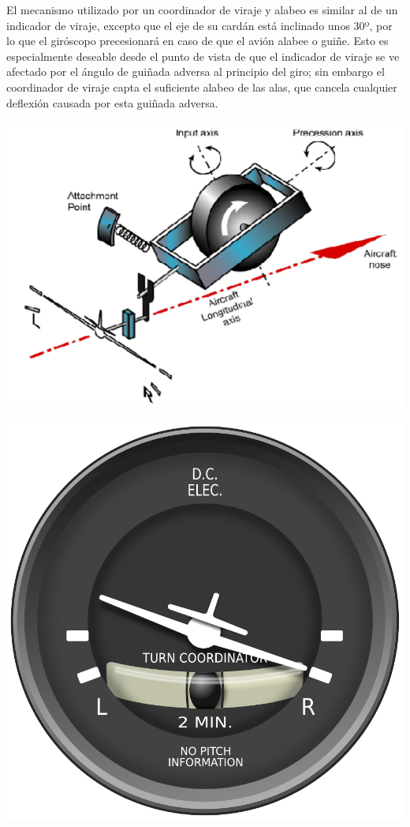 \documentclass{article}
\begin{document}
 El mecanismo utilizado por un coordinador de viraje y alabeo es similar al de un indicador de viraje, excepto que el eje de su cardán está inclinado unos 30º, por lo que el giróscopo precesionará en caso de que el avión alabee o guiñe. Esto es especialmente deseable desde el punto de vista de que el indicador de viraje se ve afectado por el ángulo de guiñada adversa al principio del giro; sin embargo el coordinador de viraje capta el suficiente alabeo de las alas, que cancela cualquier deflexión causada por esta guiñada adversa.
 \begin{center}
\includegraphics[scale=0.69]{figuras/Turn_coordinator-spring}
\label{fig:tcspring}
\end{center}

\begin{center}
\includegraphics[scale=0.39]{figuras/Turn_coordinator}
\label{fig:tc}
\end{center}
\end{document}
